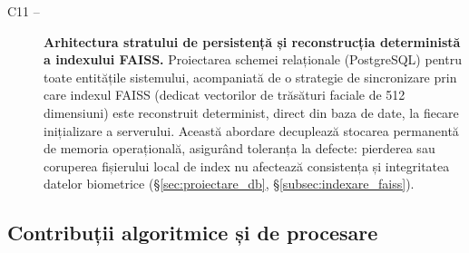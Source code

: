 \documentclass[../../main.tex]{subfiles}
\begin{document}
\begin{description}
	\item[C11 --] \textbf{Arhitectura stratului de persistență și reconstrucția deterministă a indexului FAISS.} Proiectarea schemei relaționale (PostgreSQL) pentru toate entitățile sistemului, acompaniată de o strategie de sincronizare prin care indexul FAISS (dedicat vectorilor de trăsături faciale de 512 dimensiuni) este reconstruit determinist, direct din baza de date, la fiecare inițializare a serverului. Această abordare decuplează stocarea permanentă de memoria operațională, asigurând toleranța la defecte: pierderea sau coruperea fișierului local de index nu afectează consistența și integritatea datelor biometrice (\S\ref{sec:proiectare_db}, \S\ref{subsec:indexare_faiss}).
\end{description}

\subsection{Contribuții algoritmice și de procesare}
\label{subsec:contributii_algoritmice}
\end{document}
